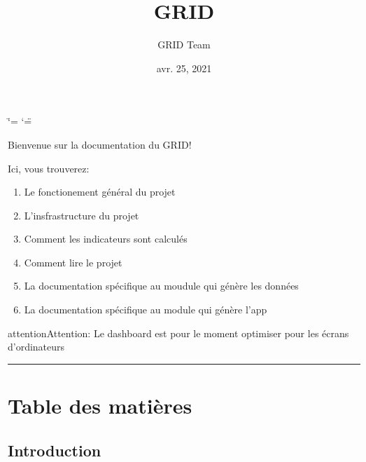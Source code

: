\documentclass[letterpaper,10pt,french]{sphinxmanual}
\title{GRID}
\date{avr. 25, 2021}
\author{GRID Team}
\begin{document}
\ifdefined\shorthandoff
  \ifnum\catcode`\=\string=\active\shorthandoff{=}\fi
  \ifnum\catcode`\"=\active{}\fi
\fi

\pagestyle{empty}
\sphinxmaketitle
\pagestyle{plain}
\sphinxtableofcontents
\pagestyle{normal}
\label{\detokenize{index::doc}}


\sphinxAtStartPar
Bienvenue sur la documentation du GRID!

\sphinxAtStartPar
Ici, vous trouverez:
\begin{enumerate}
%
\item {} 
\sphinxAtStartPar
Le fonctionement général du projet

\item {} 
\sphinxAtStartPar
L’insfrastructure du projet

\item {} 
\sphinxAtStartPar
Comment les indicateurs sont calculés

\item {} 
\sphinxAtStartPar
Comment lire le projet

\item {} 
\sphinxAtStartPar
La documentation spécifique au moudule  qui génère les données

\item {} 
\sphinxAtStartPar
La documentation spécifique au module  qui génère l’app

\end{enumerate}

\sphinxAtStartPar
{}

\begin{sphinxadmonition}{attention}{Attention:}
\sphinxAtStartPar
Le dashboard est pour le moment optimiser pour les écrans d’ordinateurs
\end{sphinxadmonition}


\bigskip\hrule\bigskip



\chapter{Table des matières}
\label{\detokenize{index:table-des-matieres}}

\section{Introduction}
\label{\detokenize{intro:introduction}}\label{\detokenize{intro::doc}}
\end{document}
